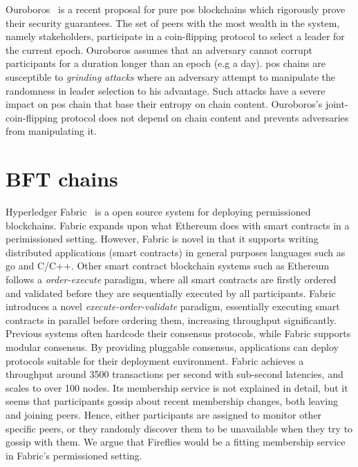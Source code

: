 \documentclass[USenglish]{uit-thesis}
\begin{document}
Ouroboros~\cite{provepos} is a recent proposal for pure \gls{pos} blockchains which rigorously prove their security guarantees.
The set of peers with the most wealth in the system, namely stakeholders, participate in a coin-flipping protocol to select a leader for the current epoch.
Ouroboros assumes that an adversary cannot corrupt participants for a duration longer than an epoch (e.g a day).
\gls{pos} chains are susceptible to \textit{grinding attacks} where an adversary attempt to manipulate the randomness in leader selection to his advantage.
Such attacks have a severe impact on \gls{pos} chain that base their entropy on chain content.
Ouroboros's joint-coin-flipping protocol does not depend on chain content and prevents adversaries from manipulating it.


\section{BFT chains}
Hyperledger Fabric~\cite{hyper, hyper2, hyper3, hyper4} is a open source system for deploying permissioned blockchains.
Fabric expands upon what Ethereum does with smart contracts in a perimissioned setting.
However, Fabric is novel in that it supports writing distributed applications (smart contracts) in general purposes languages such as \gls{go} and C/C++.
Other smart contract blockchain systems such as Ethereum~\cite{ether} follows a \textit{order-execute} paradigm, where all smart contracts are firstly ordered and validated before they are sequentially executed by all participants.
Fabric introduces a novel \textit{execute-order-validate} paradigm, essentially executing smart contracts in parallel before ordering them, increasing throughput significantly.
Previous systems often hardcode their consensus protocols, while Fabric supports modular consensus.
By providing pluggable consensus, applications can deploy protocols suitable for their deployment environment.	
Fabric achieves a throughput around 3500 transactions per second with sub-second latencies, and scales to over 100 nodes.
Its membership service is not explained in detail, but it seems that participants gossip about recent membership changes, both leaving and joining peers.
Hence, either participants are assigned to monitor other specific peers, or they randomly discover them to be unavailable when they try to gossip with them.
We argue that Fireflies would be a fitting membership service in Fabric's permissioned setting.
\end{document}
